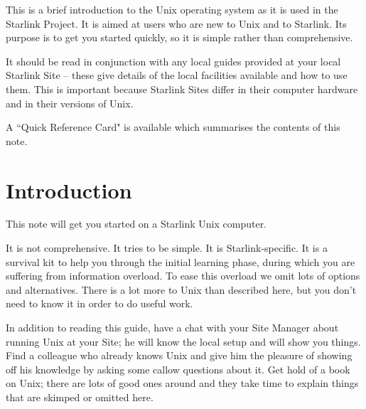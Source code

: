 This is a brief introduction to the Unix operating system as it is used
in the Starlink Project.
It is aimed at users who are new to Unix and to Starlink.
Its purpose is to get you started quickly, so it is simple rather than
comprehensive.

It should be read in conjunction with any local guides provided at your
local Starlink Site -- these give details of the local facilities available
and how to use them.
This is important because Starlink Sites differ in their computer hardware
and in their versions of Unix.

A ``Quick Reference Card" is available which summarises the contents of this
note.
 \newpage
 \begin{latexonly}
   \setlength{\parskip}{0mm}
   \latexonlytoc
   \setlength{\parskip}{\medskipamount}
   \markright{\stardocname}
 \end{latexonly}
\newpage
\renewcommand{\thepage}{\arabic{page}}
\setcounter{page}{1}

\newpage

\section{Introduction}

This note will get you started on a Starlink Unix computer.

It is not comprehensive.
It tries to be simple.
It is Starlink-specific.
It is a survival kit to help you through the initial learning phase, during
which you are suffering from information overload.
To ease this overload we omit lots of options and alternatives.
There is a lot more to Unix than described here, but you don't need to
know it in order to do useful work.

In addition to reading this guide, have a chat with your Site Manager about
running Unix at your Site; he will know the local setup and will show
you things.
Find a colleague who already knows Unix and give him the pleasure of showing
off his knowledge by asking some callow questions about it.
Get hold of a book on Unix; there are lots of good ones around and
they take time to explain things that are skimped or omitted here.

